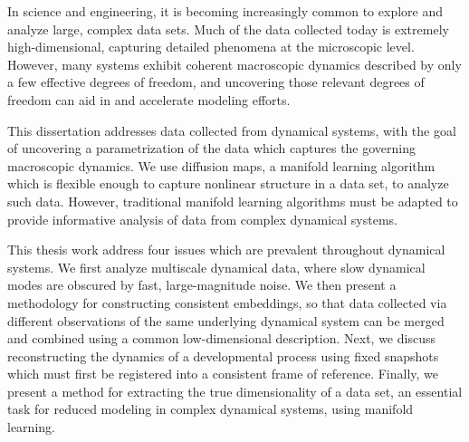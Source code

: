 

In science and engineering, it is becoming increasingly common to explore and analyze large, complex data sets.
%
Much of the data collected today is extremely high-dimensional, capturing detailed phenomena at the microscopic level.
%
However, many systems exhibit coherent macroscopic dynamics described by only a few effective degrees of freedom, and uncovering those relevant degrees of freedom can aid in and accelerate modeling efforts.

This dissertation addresses data collected from dynamical systems, with the goal of uncovering a parametrization of the data which captures the governing macroscopic dynamics.
%
We use diffusion maps, a manifold learning algorithm which is flexible enough to capture nonlinear structure in a data set, to analyze such data.
%
However, traditional manifold learning algorithms must be adapted to provide informative analysis of data from complex dynamical systems.

This thesis work address four issues which are prevalent throughout dynamical systems.
%
We first analyze multiscale dynamical data, where slow dynamical modes are obscured by fast, large-magnitude noise.
%
We then present a methodology for constructing consistent embeddings, so that data collected via different observations of the same underlying dynamical system can be merged and combined using a common low-dimensional description.
%
Next, we discuss reconstructing the dynamics of a developmental process using fixed snapshots which must first be registered into a consistent frame of reference.
%
Finally, we present a method for extracting the true dimensionality of a data set, an essential task for reduced modeling in complex dynamical systems, using manifold learning. 